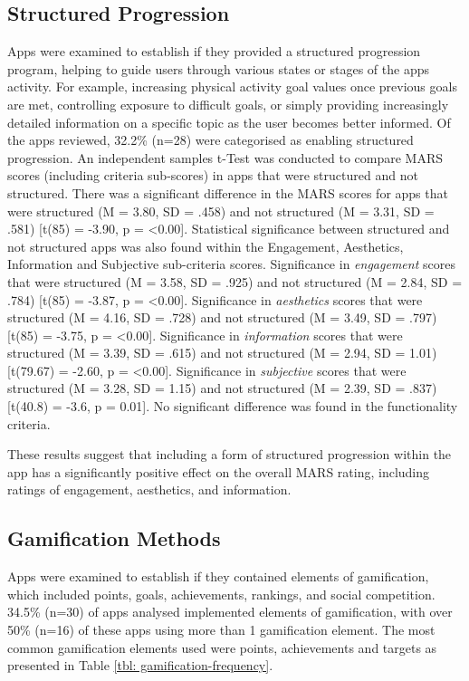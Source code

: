 \subsection{Structured Progression}
Apps were examined to establish if they provided a structured progression program, helping to guide users through various states or stages of the apps activity. For example, increasing physical activity goal values once previous goals are met, controlling exposure to difficult goals, or simply providing increasingly detailed information on a specific topic as the user becomes better informed. Of the apps reviewed, 32.2\% (n=28) were categorised as enabling structured progression.
An independent samples t-Test was conducted to compare MARS scores (including criteria sub-scores) in apps that were structured and not structured. There was a significant difference in the MARS scores for apps that were structured (M = 3.80, SD = .458) and not structured (M = 3.31, SD = .581) [t(85) = -3.90, p = \textless0.00]. Statistical significance between structured and not structured apps was also found within the Engagement, Aesthetics, Information and Subjective sub-criteria scores.
\newline Significance in \textit{engagement} scores that were structured (M = 3.58, SD = .925) and not structured (M = 2.84, SD = .784) [t(85) = -3.87, p = \textless0.00].
\newline Significance in \textit{aesthetics} scores that were structured (M = 4.16, SD = .728) and not structured (M = 3.49, SD = .797) [t(85) = -3.75, p = \textless0.00].
\newline Significance in \textit{information} scores that were structured (M = 3.39, SD = .615) and not structured (M = 2.94, SD = 1.01) [t(79.67) = -2.60, p = \textless0.00].
\newline Significance in \textit{subjective} scores that were structured (M = 3.28, SD = 1.15) and not structured (M = 2.39, SD = .837) [t(40.8) = -3.6, p = 0.01]. No significant difference was found in the functionality criteria.

These results suggest that including a form of structured progression within the app has a significantly positive effect on the overall MARS rating, including ratings of engagement, aesthetics, and information.

\subsection{Gamification Methods}
Apps were examined to establish if they contained elements of gamification, which included points, goals, achievements, rankings, and social competition. 34.5\% (n=30) of apps analysed implemented elements of gamification, with over 50\% (n=16) of these apps using more than 1 gamification element.
The most common gamification elements used were points, achievements and targets as presented in Table \ref{tbl: gamification-frequency}.

